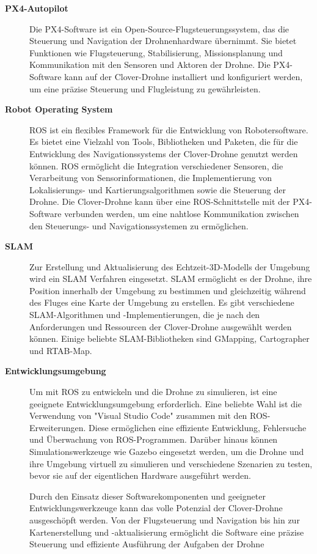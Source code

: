 \begin{description}
    \item[\textbf{PX4-Autopilot}] Die PX4-Software ist ein Open-Source-Flugsteuerungssystem, das die Steuerung und Navigation der Drohnenhardware übernimmt. Sie bietet Funktionen wie Flugsteuerung, Stabilisierung, Missionsplanung und Kommunikation mit den Sensoren und Aktoren der Drohne. Die PX4-Software kann auf der Clover-Drohne installiert und konfiguriert werden, um eine präzise Steuerung und Flugleistung zu gewährleisten.
    
    \item[\textbf{Robot Operating System}] ROS ist ein flexibles Framework für die Entwicklung von Robotersoftware. Es bietet eine Vielzahl von Tools, Bibliotheken und Paketen, die für die Entwicklung des Navigationssystems der Clover-Drohne genutzt werden können. ROS ermöglicht die Integration verschiedener Sensoren, die Verarbeitung von Sensorinformationen, die Implementierung von Lokalisierungs- und Kartierungsalgorithmen sowie die Steuerung der Drohne. Die Clover-Drohne kann über eine ROS-Schnittstelle mit der PX4-Software verbunden werden, um eine nahtlose Kommunikation zwischen den Steuerungs- und Navigationssystemen zu ermöglichen.
    \item[\textbf{\ac{SLAM}}] Zur Erstellung und Aktualisierung des Echtzeit-3D-Modells der Umgebung wird ein \ac{SLAM} Verfahren eingesetzt. \ac{SLAM} ermöglicht es der Drohne, ihre Position innerhalb der Umgebung zu bestimmen und gleichzeitig während des Fluges eine Karte der Umgebung zu erstellen. Es gibt verschiedene SLAM-Algorithmen und -Implementierungen, die je nach den Anforderungen und Ressourcen der Clover-Drohne ausgewählt werden können. Einige beliebte SLAM-Bibliotheken sind GMapping, Cartographer und RTAB-Map.
    
    \item[\textbf{Entwicklungsumgebung}]  Um mit ROS zu entwickeln und die Drohne zu simulieren, ist eine geeignete Entwicklungsumgebung erforderlich. Eine beliebte Wahl ist die Verwendung von "Visual Studio Code" zusammen mit den ROS-Erweiterungen. Diese ermöglichen eine effiziente Entwicklung, Fehlersuche und Überwachung von ROS-Programmen. Darüber hinaus können Simulationswerkzeuge wie Gazebo eingesetzt werden, um die Drohne und ihre Umgebung virtuell zu simulieren und verschiedene Szenarien zu testen, bevor sie auf der eigentlichen Hardware ausgeführt werden.

    Durch den Einsatz dieser Softwarekomponenten und geeigneter Entwicklungswerkzeuge kann das volle Potenzial der Clover-Drohne ausgeschöpft werden. Von der Flugsteuerung und Navigation bis hin zur Kartenerstellung und -aktualisierung ermöglicht die Software eine präzise Steuerung und effiziente Ausführung der Aufgaben der Drohne
     
\end{description}

